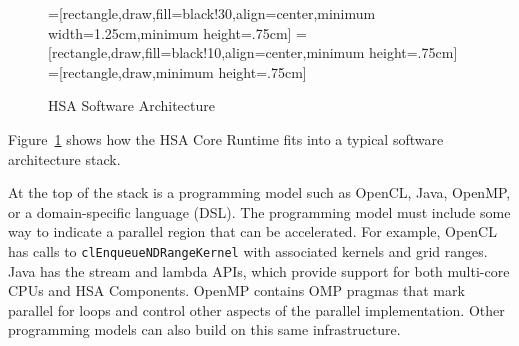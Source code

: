 \documentclass[draft]{book}
\begin{document}
\begin{figure}
  \centering
  =[rectangle,draw,fill=black!30,align=center,minimum width=1.25cm,minimum height=.75cm]
  =[rectangle,draw,fill=black!10,align=center,minimum height=.75cm]
  =[rectangle,draw,minimum height=.75cm]
  \caption{HSA Software Architecture}
  \label{fig:swarch}
\end{figure}

Figure~\ref{fig:swarch} shows how the HSA Core Runtime fits into a
typical software architecture stack.

At the top of the stack is a programming model such as OpenCL\texttrademark,
Java, OpenMP, or a domain-specific language (DSL). The programming model must
include some way to indicate a parallel region that can be accelerated. For
example, OpenCL has calls to \texttt{clEnqueueNDRangeKernel} with associated
kernels and grid ranges. Java has the stream and lambda APIs, which provide
support for both multi-core CPUs and HSA Components. OpenMP contains OMP pragmas
that mark parallel for loops and control other aspects of the parallel
implementation.  Other programming models can also build on this same
infrastructure.
\end{document}
